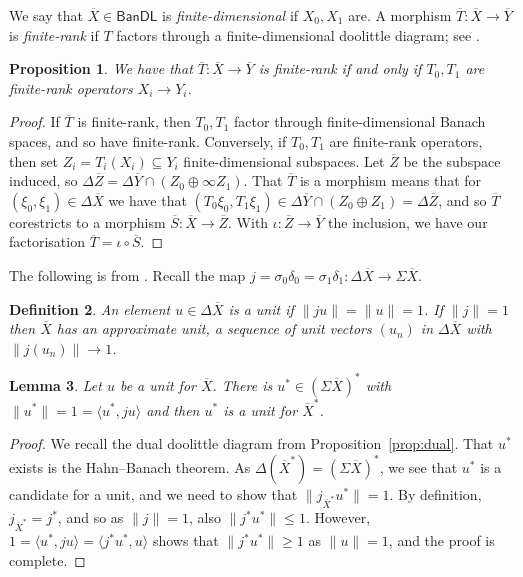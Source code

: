 \documentclass[a4paper,11pt]{article}
\theoremstyle{plain}
\newtheorem{proposition}{Proposition}[section]
\newtheorem{lemma}[proposition]{Lemma}
\newtheorem{definition}[proposition]{Definition}
\theoremstyle{remark}
\newcommand{\msf}[1]{\mathsf{#1}}
\newcommand{\ip}[2]{{\langle {#1} , {#2} \rangle}}
\begin{document}
We say that $\overline X \in \msf{BanDL}$ is \emph{finite-dimensional} if $X_0,X_1$ are.  A morphism $\overline T \colon \overline X \to \overline Y$ is \emph{finite-rank} if $T$ factors through a finite-dimensional doolittle diagram; see \cite[Section~V.3]{KP_InterpolationFunctorsDuality}.

\begin{proposition}
We have that $\overline T \colon \overline X \to \overline Y$ is finite-rank if and only if $T_0,T_1$ are finite-rank operators $X_i\to Y_i$.
\end{proposition}
\begin{proof}
If $\overline T$ is finite-rank, then $T_0, T_1$ factor through finite-dimensional Banach spaces, and so have finite-rank.  Conversely, if $T_0, T_1$ are finite-rank operators, then set $Z_i = T_i(X_i) \subseteq Y_i$ finite-dimensional subspaces.  Let $\overline Z$ be the subspace induced, so $\Delta\overline Z = \Delta\overline Y \cap (Z_0 \oplus\infty Z_1)$.  That $\overline T$ is a morphism means that for $(\xi_0, \xi_1) \in \Delta\overline X$ we have that $(T_0\xi_0, T_1\xi_1) \in \Delta\overline Y \cap (Z_0 \oplus Z_1) = \Delta\overline Z$, and so $\overline T$ corestricts to a morphism $\overline S \colon \overline X\to\overline Z$.  With $\iota\colon \overline Z \to \overline Y$ the inclusion, we have our factorisation $\overline T = \iota \circ \overline S$.
\end{proof}

The following is from \cite[Section~IV.2]{KP_InterpolationFunctorsDuality}.  Recall the map $j = \sigma_0\delta_0 = \sigma_1\delta_1 \colon \Delta\overline X \to \Sigma\overline X$.

\begin{definition}
An element $u\in\Delta\overline X$ is a \emph{unit} if $\|ju\| = \|u\| = 1$.  If $\|j\|=1$ then $\overline X$ has an \emph{approximate unit}, a sequence of unit vectors $(u_n)$ in $\Delta\overline X$ with $\|j(u_n)\| \to 1$.
\end{definition}

\begin{lemma}
Let $u$ be a unit for $\overline X$.  There is $u^* \in (\Sigma\overline X)^*$ with $\|u^*\| = 1 = \ip{u^*}{ju}$ and then $u^*$ is a unit for $\overline X^*$.
\end{lemma}
\begin{proof}
We recall the dual doolittle diagram from Proposition~\ref{prop:dual}.  That $u^*$ exists is the Hahn--Banach theorem.  As $\Delta(\overline X^*) = (\Sigma\overline X)^*$, we see that $u^*$ is a candidate for a unit, and we need to show that $\|j_{\overline X^*}u^*\|=1$.  By definition, $j_{\overline X^*} = j^*$, and so as $\|j\|=1$, also $\|j^*u^*\|\leq 1$.  However, $1 = \ip{u^*}{ju} = \ip{j^*u^*}{u}$ shows that $\|j^*u^*\|\geq 1$ as $\|u\|=1$, and the proof is complete.
\end{proof}
\end{document}
